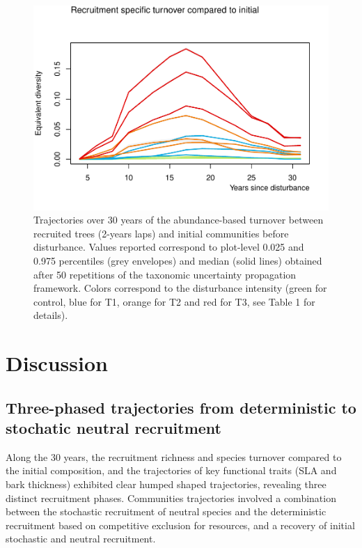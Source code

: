 \documentclass[fleqn,10pt]{ArtEcoFoG} %
\begin{document}
\begin{figure}

{\centering \includegraphics{RecruitmentTrajectories_files/figure-latex/Turnover-1} 

}

\caption{Trajectories over 30 years of the abundance-based turnover between recruited trees (2-years laps) and initial communities before disturbance. Values reported correspond to plot-level 0.025 and 0.975 percentiles (grey envelopes) and median (solid lines) obtained after 50 repetitions of the taxonomic uncertainty propagation framework. Colors correspond to the disturbance intensity (green for control, blue for T1, orange for T2 and red for T3, see Table 1 for details).}\label{fig:Turnover}
\end{figure}

\section{Discussion}\label{discussion}

\subsection{Three-phased trajectories from deterministic to stochatic
neutral
recruitment}\label{three-phased-trajectories-from-deterministic-to-stochatic-neutral-recruitment}

Along the 30 years, the recruitment richness and species turnover
compared to the initial composition, and the trajectories of key
functional traits (SLA and bark thickness) exhibited clear humped shaped
trajectories, revealing three distinct recruitment phases. Communities
trajectories involved a combination between the stochastic recruitment
of neutral species and the deterministic recruitment based on
competitive exclusion for resources, and a recovery of initial
stochastic and neutral recruitment.
\end{document}
